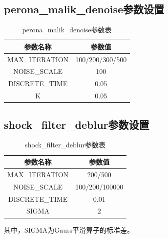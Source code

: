 \documentclass[a4paper, UTF8]{ctexrep}
\begin{document}
			\subsection{perona\_malik\_denoise参数设置}
				\begin{table}[htbp!]
					\centering
					\begin{tabular}{cc}
						\hline
						参数名称 & 参数值 \\
						\hline
						MAX\_ITERATION & 100/200/300/500 \\
						NOISE\_SCALE & 100 \\
						DISCRETE\_TIME & 0.05 \\
						K & 0.05 \\
						\hline
					\end{tabular}
					\caption{perona\_malik\_denoise参数表}
				\end{table}
			\subsection{shock\_filter\_deblur参数设置}
				\begin{table}[htbp!]
					\centering
					\begin{tabular}{cc}
						\hline
						参数名称 & 参数值 \\
						\hline
						MAX\_ITERATION & 200/500 \\
						NOISE\_SCALE & 100/200/100000 \\
						DISCRETE\_TIME & 0.01 \\
						SIGMA & 2 \\
						\hline
					\end{tabular}
					\caption{shock\_filter\_deblur参数表}
				\end{table}
				其中，SIGMA为Gauss平滑算子的标准差。
\end{document}
